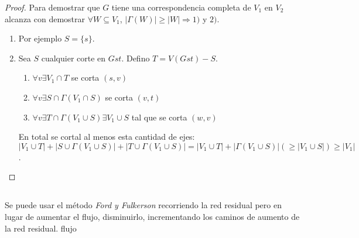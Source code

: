 \begin{proof}
	Para demostrar que $G$ tiene una correspondencia completa de $V_1$ en
	$V_2$ alcanza con demostrar $\forall W \subseteq V_1$, $|\Gamma(W)| \geq |W| \Longrightarrow 1)$ y $2)$.

	\begin{enumerate}
		\item Por ejemplo $S = \{s\}$.
		\item {
			Sea $S$ cualquier corte en $G{st}$. Defino $T = V(G{st}) - S$.

			\begin{enumerate}[label=\alph*)]
				\item $\forall v \exists V_1 \cap T$ se corta $(s, v)$
				\item $\forall v \exists S \cap \Gamma(V_1 \cap S)$ se corta $(v, t)$
				\item $\forall v \exists T \cap \Gamma(V_1 \cup S) \exists V_1 \cup S$ tal que se corta $(w, v)$
			\end{enumerate}

			En total se cortal al menos esta cantidad de ejes: $|V_1 \cup T| + |S \cup \Gamma(V_1 \cup S)| + |T \cup \Gamma(V_1 \cup S)| = |V_1 \cup T| + |\Gamma(V_1 \cup S)|(\geq |V_1 \cup S|) \geq |V_1|$.
		}
	\end{enumerate}
\end{proof}

\setcounter{subsection}{14}
\subsection{}
Se puede usar el método \textit{Ford y Fulkerson} recorriendo la red
residual pero en lugar de aumentar el flujo, disminuirlo, incrementando los
caminos de aumento de la red residual.
flujo